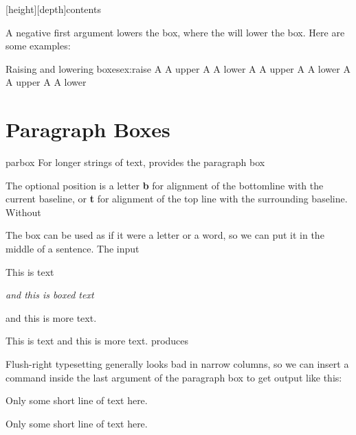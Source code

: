 {\begin{teX}
\raisebox{raiselength}[height][depth]{contents}
\end{teX}

A negative first argument lowers the box, where the \cmd{\lowerbox} will lower the box. Here are some examples:

\begin{texexample}{Raising and lowering boxes}{ex:raise}
A  A
upper
A  A
lower
A  A
upper
A  A
lower
A  A
upper
A  A
lower
\end{texexample}

\section{Paragraph Boxes}

\begin{docCommand}{parbox}{ }
  For longer strings of text, \latex provides the paragraph box \cs{parbox} 
\end{docCommand}


The optional position
is a letter \textbf{b} for alignment of the bottomline with the current baseline,
or \textbf{t} for alignment of the top line with the surrounding baseline. Without

The box can be used as if it were a letter or a word, so we can put it in
the middle of a sentence. The input

This is text \parbox{30pt}{\it and this is boxed text} and
this is more text.

This is text 
and this is more text.
produces


Flush-right typesetting generally looks bad in narrow columns, so we
can insert a \cs{raggedright} command inside the last argument of the paragraph
box to get output like this:

\begin{texexample}{}{}

\parbox[b][120pt][t]{100pt}{\lorem}%
\hspace{1cm}%
\parbox[b][120pt][t]{100pt}{Only some short line of text here.}%



\parbox[b][100pt][t]{100pt}{\lorem}\hspace{1cm}\parbox[b][100pt][c]{100pt}{Only some short line of text here.}


\end{texexample}}

